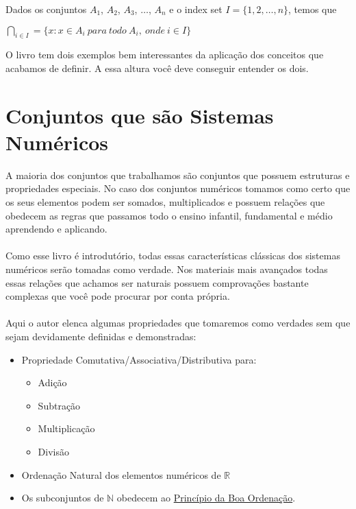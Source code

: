 \documentclass[main.tex]{subfiles}
\begin{document}
\begin{definition}
Dados os conjuntos $A_1$, $A_2$, $A_3$, $\dots$, $A_n$ e o index set $I = \{ 1 , 2 , \dots , n \}$, temos que
\begin{center}
	$\bigcap_{i \in I}\limits = \{ x : x \in A_i \ para \ todo \ A_i, \ onde \  i \in I \}$
\end{center}
\end{definition}

O livro tem dois exemplos bem interessantes da aplicação dos conceitos que acabamos de definir. A essa altura você deve conseguir entender os dois.

\section{Conjuntos que são Sistemas Numéricos}

A maioria dos conjuntos que trabalhamos são conjuntos que possuem estruturas e propriedades especiais. No caso dos conjuntos numéricos tomamos como certo que os seus elementos podem ser somados, multiplicados e possuem relações que obedecem as regras que passamos todo o ensino infantil, fundamental e médio aprendendo e aplicando.
\\~\\
Como esse livro é introdutório, todas essas características clássicas dos sistemas numéricos serão tomadas como verdade. Nos materiais mais avançados todas essas relações que achamos ser naturais possuem comprovações bastante complexas que você pode procurar por conta própria.
\\~\\
Aqui o autor elenca algumas propriedades que tomaremos como verdades sem que sejam devidamente definidas e demonstradas:
\begin{itemize}
	\item Propriedade Comutativa/Associativa/Distributiva para:
		\begin{itemize}
			\item Adição
			\item Subtração
			\item Multiplicação
			\item Divisão
		\end{itemize}
	\item Ordenação Natural dos elementos numéricos de $\mathbb{R}$
	\item Os subconjuntos de $\mathbb{N}$ obedecem ao \href{https://pt.wikipedia.org/wiki/Princ%C3%ADpio_da_boa_ordena%C3%A7%C3%A3o}{Princípio da Boa Ordenação}.
\end{itemize}
\end{document}

